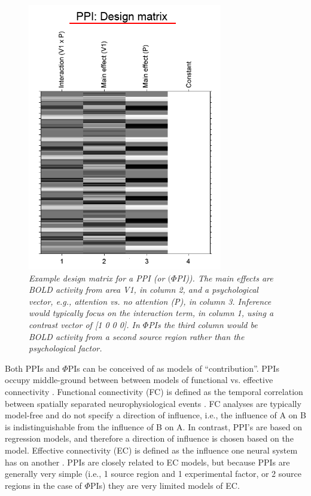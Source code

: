 \begin{figure}[h]
	\centering\includegraphics[width=85mm]{ppi/figures/Fig1.png}
	\caption{\em Example design matrix for a PPI (or \((\Phi\)PI)). The main effects are BOLD activity from area V1, in column 2, and a psychological vector, e.g., attention vs. no attention (P), in column 3. Inference would typically focus on the interaction term, in column 1, using a contrast vector of \textsc{[1 0 0 0]}. In \(\Phi\)PIs the third column would be BOLD activity from a second source region rather than the psychological factor.}
	\label{fig:ppi1}
\end{figure}

Both PPIs and $\Phi$PIs can be conceived of as models of ``contribution''. PPIs occupy middle-ground between between models of  functional vs. effective connectivity \cite{ppi}. Functional connectivity (FC) is defined as the temporal correlation between spatially separated neurophysiological events \cite{ppi}. FC analyses are typically model-free and do not specify a direction of influence, i.e., the influence of A on B is indistinguishable from the influence of B on A. In contrast, PPI's are based on regression models, and therefore a direction of influence is chosen based on the model. Effective connectivity (EC) is defined as the influence one neural system has on another \cite{func1}. PPIs are closely related to EC models, but because PPIs are generally very simple (i.e., 1 source region and 1 experimental factor, or 2 source regions in the case of $\Phi$PIs) they are very limited models of EC.

